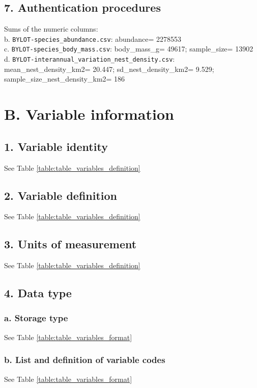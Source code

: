 \documentclass[a4paper,twoside,12pt]{article}
\begin{document}
                        \subsection*{7. Authentication procedures}
                        Sums of the numeric columns: \\
                        b. \texttt{BYLOT-species\_abundance.csv}: abundance= 2278553\\
                        c. \texttt{BYLOT-species\_body\_mass.csv}: body\_mass\_g= 49617; sample\_size= 13902\\
                        d. \texttt{BYLOT-interannual\_variation\_nest\_density.csv}: mean\_nest\_density\_km2= 20.447; sd\_nest\_density\_km2= 9.529; sample\_size\_nest\_density\_km2= 186
                        
    \section*{B. Variable information}
                \subsection*{1. Variable identity} See Table \ref{table:table_variables_definition}
        \subsection*{2. Variable definition} See Table \ref{table:table_variables_definition}
        \subsection*{3. Units of measurement} See Table \ref{table:table_variables_definition}
        \newpage
        
        
       \newpage
        
        \subsection*{4. Data type}
                    \subsubsection*{a. Storage type} See Table \ref{table:table_variables_format}
                    \subsubsection*{b. List and definition of variable codes} See Table \ref{table:table_variables_format}
\end{document}
